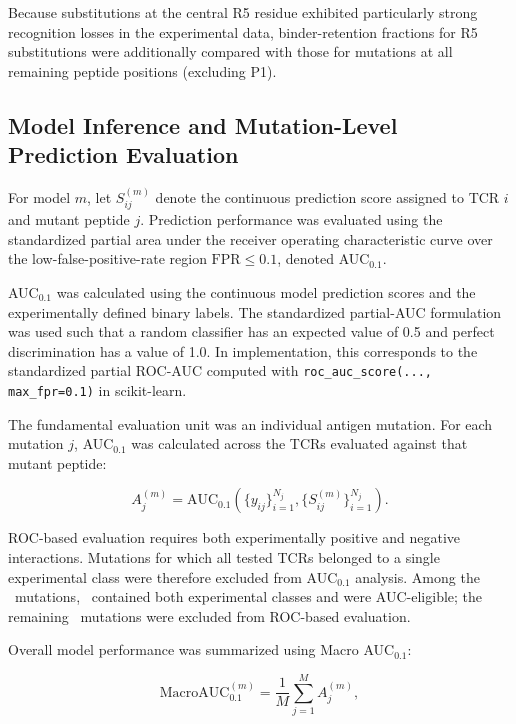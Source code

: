 \documentclass{article}
\begin{document}
Because substitutions at the central R5 residue exhibited particularly
strong recognition losses in the experimental data, binder-retention
fractions for R5 substitutions were additionally compared with those for
mutations at all remaining peptide positions (excluding P1).


\subsection{Model Inference and Mutation-Level Prediction Evaluation}

For model $m$, let $S_{ij}^{(m)}$ denote the continuous prediction score
assigned to TCR $i$ and mutant peptide $j$. Prediction performance was
evaluated using the standardized partial area under the receiver operating
characteristic curve over the low-false-positive-rate region
$\mathrm{FPR}\leq0.1$, denoted AUC$_{0.1}$.

AUC$_{0.1}$ was calculated using the continuous model prediction scores and
the experimentally defined binary labels. The standardized partial-AUC
formulation was used such that a random classifier has an expected value of
0.5 and perfect discrimination has a value of 1.0. In implementation, this
corresponds to the standardized partial ROC-AUC computed with
\texttt{roc\_auc\_score(..., max\_fpr=0.1)} in scikit-learn.

The fundamental evaluation unit was an individual antigen mutation. For each
mutation $j$, AUC$_{0.1}$ was calculated across the TCRs evaluated against
that mutant peptide:

\begin{equation}
A_j^{(m)}
=
\mathrm{AUC}_{0.1}
\left(
\{y_{ij}\}_{i=1}^{N_j},
\{S_{ij}^{(m)}\}_{i=1}^{N_j}
\right).
\label{eq:mutation_auc}
\end{equation}

ROC-based evaluation requires both experimentally positive and negative
interactions. Mutations for which all tested TCRs belonged to a single
experimental class were therefore excluded from AUC$_{0.1}$ analysis.
Among the \valNmutations\ mutations, \valNeligible\ contained both experimental classes and were
AUC-eligible; the remaining \valNexcluded\ mutations were excluded from ROC-based
evaluation.

Overall model performance was summarized using Macro AUC$_{0.1}$:

\begin{equation}
\mathrm{MacroAUC}_{0.1}^{(m)}
=
\frac{1}{M}
\sum_{j=1}^{M}
A_j^{(m)},
\label{eq:macro_auc}
\end{equation}
\end{document}
